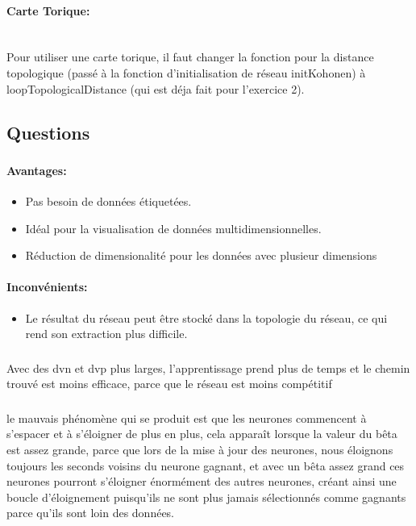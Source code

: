 \documentclass{article}
\begin{document}
\vspace{1mm}
\paragraph{Carte Torique:}\\
   Pour utiliser une carte torique, il faut changer la fonction pour la
distance topologique (passé à la fonction d'initialisation de réseau
initKohonen) à loopTopologicalDistance (qui est déja fait pour l'exercice 2).

\subsection{Questions}
\subsubsection{ }
\paragraph{Avantages:}
\begin{itemize}
   \item Pas besoin de données étiquetées.
   \item Idéal pour la visualisation de données multidimensionnelles.
   \item Réduction de dimensionalité pour les données avec plusieur
      dimensions
\end{itemize}

\paragraph{Inconvénients:}
\begin{itemize}
   \item Le résultat du réseau peut être stocké dans la topologie du 
      réseau, ce qui rend son extraction plus difficile.
\end{itemize}

\subsubsection{ }
Avec des dvn et dvp plus larges, l'apprentissage prend plus de temps
et le chemin trouvé est moins efficace, parce que le réseau est moins compétitif

\subsubsection{ }
le mauvais phénomène qui se produit est que les neurones commencent à s'espacer
et à s'éloigner de plus en plus, cela apparaît lorsque la valeur du bêta est
assez grande, parce que lors de la mise à jour des neurones, nous éloignons
toujours les seconds voisins du neurone gagnant, et avec un bêta assez grand
ces neurones pourront s'éloigner énormément des autres neurones, créant ainsi
une boucle d'éloignement puisqu'ils ne sont plus jamais sélectionnés comme
gagnants parce qu'ils sont loin des données.
\end{document}
